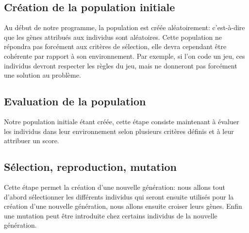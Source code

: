 
\subsection{Création de la population initiale}

	Au début de notre programme, la population est créée aléatoirement: c'est-à-dire que les gènes attribués aux individus sont aléatoires. Cette population ne répondra pas forcément aux critères de sélection, elle devra cependant être cohérente par rapport à son environnement. Par exemple, si l'on code un jeu, ces individus devront respecter les règles du jeu, mais ne donneront pas forcément une solution au problème.\\

\subsection{Evaluation de la population}

	Notre population initiale étant créée, cette étape consiste maintenant à évaluer les individus dans leur environnement selon plusieurs critères définis et à leur attribuer un score.\\

\subsection{Sélection, reproduction, mutation}

	Cette étape permet la création d'une nouvelle génération: nous allons tout d'abord sélectionner les différents individus qui seront ensuite utilisés pour la création d'une nouvelle génération, nous allons ensuite croiser leurs gènes. Enfin une mutation peut être introduite chez certains individus de la nouvelle génération.
 
